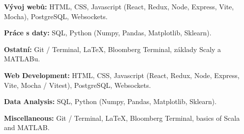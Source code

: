 \ifczech

\textbf{Vývoj webů:} HTML, CSS, Javascript (React, Redux, Node, Express, Vite, Mocha), PostgreSQL, Websockets. \par
\textbf{Práce s daty:} SQL, Python (Numpy, Pandas, Matplotlib, Sklearn). \par
\textbf{Ostatní:} Git / Terminal, LaTeX, Bloomberg Terminal, základy Scaly a MATLABu. \par

\else

\textbf{Web Development:} HTML, CSS, Javascript (React, Redux, Node, Express, Vite, Mocha / Vitest), PostgreSQL, Websockets. \par
\textbf{Data Analysis:} SQL, Python (Numpy, Pandas, Matplotlib, Sklearn). \par
\textbf{Miscellaneous:} Git / Terminal, LaTeX, Bloomberg Terminal, basics of Scala and MATLAB. \par

\fi
